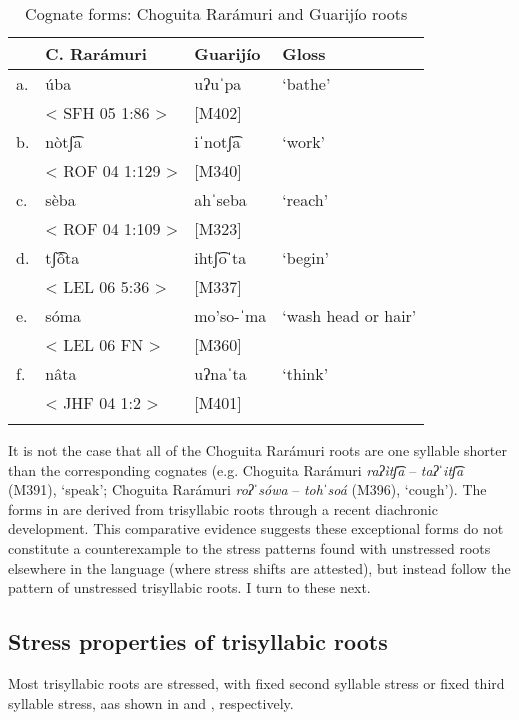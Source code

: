 \begin{table}
\caption{Cognate forms: Choguita Rarámuri and Guarijío roots}
\label{tab:guarijio-cognates}

\begin{tabularx}{\textwidth}{lXXl}
\lsptoprule
&\textbf{C. Rarámuri} & \textbf{Guarijío} & \textbf{Gloss} \\
\midrule
a.& úba   & uʔuˈpa   & `bathe’ \\
&  < SFH 05 1:86 > & [M402] \\
b.& nòtʃ͡a  &  iˈnotʃ͡a   & `work'\\
&  < ROF 04 1:129 > &   [M340] \\
c.& sèba   & ahˈseba     & `reach’\\
&  < ROF 04 1:109 > &   [M323]\\
d.& tʃ͡ôta  &  ihtʃ͡oˈta  &  `begin' \\
&  < LEL 06 5:36 > &   [M337]\\
e.& sóma   & mo’so-ˈma    & `wash head or hair’ \\
  &< LEL 06 FN > & [M360] & \\
f.& nâta   & uʔnaˈta    &  `think’ \\
  &< JHF 04 1:2 > & [M401] \\
  \lspbottomrule
\end{tabularx}
\end{table}

It is not the case that all of the Choguita Rarámuri roots are one syllable shorter than the corresponding  cognates (e.g. Choguita Rarámuri \textit{raʔìtʃ͡a} --  \textit{taʔˈitʃ͡a} (M391), ‘speak’; Choguita Rarámuri \textit{roʔˈsówa} --  \textit{tohˈsoá} (M396), ‘cough’). The forms in  are derived from trisyllabic roots through a recent diachronic development. This comparative evidence suggests these exceptional forms do not constitute a counterexample to the stress patterns found with unstressed roots elsewhere in the language (where stress shifts are attested), but instead follow the pattern of unstressed trisyllabic roots. I turn to these next.

\subsection{Stress properties of trisyllabic roots}
\label{subsubsec*: stress properties of trisyllabic roots}

Most trisyllabic roots are stressed, with fixed second syllable stress or fixed third syllable stress, aas shown in  and , respectively.

